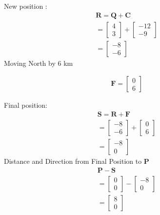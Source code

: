 \documentclass[journal]{IEEEtran}
\begin{document}
New position :
\begin{align}
\mathbf{R} = \mathbf{Q} + \mathbf{C} \\
= \begin{bmatrix} 4 \\ 3 \end{bmatrix} + \begin{bmatrix} -12 \\ -9 \end{bmatrix} \\
= \begin{bmatrix} -8 \\ -6 \end{bmatrix}
\end{align}
Moving North by 6 km

\begin{align}
\mathbf{F} = \begin{bmatrix} 0 \\ 6 \end{bmatrix}
\end{align}

Final position:
\begin{align}
\mathbf{S} = \mathbf{R} + \mathbf{F} \\
= \begin{bmatrix} -8 \\ -6 \end{bmatrix} + \begin{bmatrix} 0 \\ 6 \end{bmatrix} \\
=\begin{bmatrix} -8 \\ 0 \end{bmatrix}
\end{align}
Distance and Direction from Final Position to $\mathbf{P}$
\begin{align}
\mathbf{P} - \mathbf{S} \\
= \begin{bmatrix} 0 \\ 0 \end{bmatrix} - \begin{bmatrix} -8 \\ 0 \end{bmatrix} \\
= \begin{bmatrix} 8 \\ 0 \end{bmatrix}
\end{align}
\end{document}

